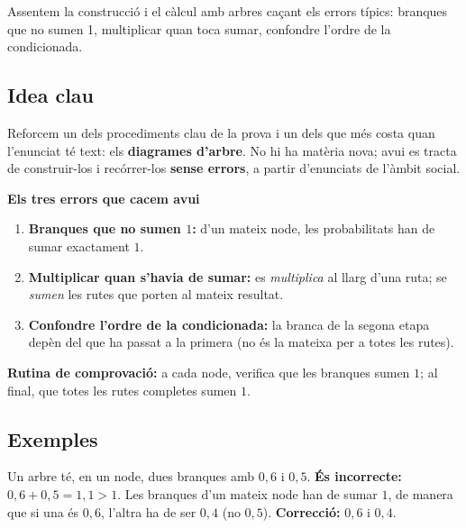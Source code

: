 %
{Assentem la construcció i el càlcul amb arbres caçant els errors típics: branques que no sumen 1, multiplicar quan toca sumar, confondre l'ordre de la condicionada.}

\subsection{Idea clau}

Reforcem un dels procediments clau de la prova i un dels que més costa quan l'enunciat
té text: els \textbf{diagrames d'arbre}. No hi ha matèria nova; avui es tracta de
construir-los i recórrer-los \textbf{sense errors}, a partir d'enunciats de l'àmbit
social.

\begin{idea}
\textbf{Els tres errors que cacem avui}
\begin{enumerate}[leftmargin=1.6em, itemsep=2pt]
  \item \textbf{Branques que no sumen $1$:} d'un mateix node, les probabilitats han de
        sumar exactament $1$.
  \item \textbf{Multiplicar quan s'havia de sumar:} es \emph{multiplica} al llarg d'una
        ruta; se \emph{sumen} les rutes que porten al mateix resultat.
  \item \textbf{Confondre l'ordre de la condicionada:} la branca de la segona etapa
        depèn del que ha passat a la primera (no és la mateixa per a totes les rutes).
\end{enumerate}
\textbf{Rutina de comprovació:} a cada node, verifica que les branques sumen $1$; al
final, que totes les rutes completes sumen $1$.
\end{idea}

\subsection{Exemples}

\begin{exemple}
Un arbre té, en un node, dues branques amb $0,6$ i $0,5$. \textbf{És incorrecte:}
$0,6+0,5=1,1>1$. Les branques d'un mateix node han de sumar $1$, de manera que si una
és $0,6$, l'altra ha de ser $0,4$ (no $0,5$). \textbf{Correcció:} $0,6$ i $0,4$.
\end{exemple}

